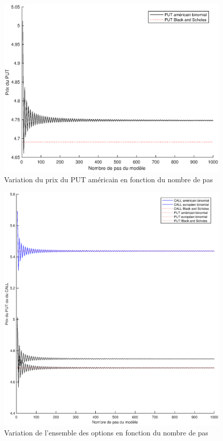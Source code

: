 \begin{figure}[H]
\centering
\includegraphics[scale=0.6]{./img/PUT_AMER-BS.eps}
\caption{Variation du prix du PUT américain en fonction du nombre de pas}
\label{fig:put_amer_mb}
\end{figure}

\begin{figure}[H]
\centering
\includegraphics[scale=0.6]{./img/CALL_A_E-PUT_A_E-BS.eps}
\caption{Variation de l'ensemble des options en fonction du nombre de pas}
\label{fig:evol_mb}
\end{figure}


